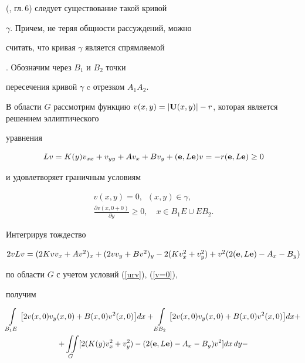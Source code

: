 \begin{pf}
(\cite{bers}, гл.\,6) следует существование такой кривой


$\gamma$. Причем, не теряя общности рассуждений, можно


считать, что кривая $\gamma$ является спрямляемой


\cite{soldier}. Обозначим через $B_1$ и $B_2$ точки


пересечения кривой $\gamma$ c отрезком $A_1A_2$.


В области $G$ рассмотрим функцию $v(x,y)=|{\bold


U}(x,y)|-r$, которая является решением эллиптического


уравнения


\begin{equation}\label{urv}


Lv =K(y)v_{xx}+v_{yy}+Av_x+Bv_y+({\bold e},L{\bold


e})v=-r({\bold e},L{\bold e})\ge 0


\end{equation}


и удовлетворяет граничным условиям


\begin{gather}


v(x,y)=0,\ \;(x,y)\in\gamma,\label{v=0}\\


\frac{\partial v(x,0+0)}{\partial y}\ge 0,\quad x\in B_1E\cup


EB_2.\label{vy>0}


\end{gather}


Интегрируя тождество


$2vLv=(2Kvv_x+Av^2)_x+(2vv_y+Bv^2)_y-


2(Kv_x^2+v_y^2)+v^2 (2({\bold e},L{\bold e})-A_x-B_y)$


по области $G$ с учетом условий (\ref{urv}), (\ref{v=0}),


получим


\begin{multline}\label{itog}


\int\limits_{B_1E}{\left[2v(x,0)v_y(x,0)+B(x,0)v^2(x,0)\right]}dx+


\int\limits_{EB_2}{\left[ 2v(x,0)v_y(x,0)+B(x,0)v^2(x,0) \right]}dx+ \\


%


+\iint\limits_{G}[2(K(y)v_x^2+v_y^2)


-(2({\bold e},L{\bold e})-A_x-B_y)v^2]dx\,dy-



\end{multline}
\end{pf}
